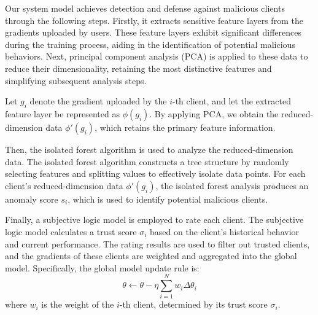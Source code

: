 \documentclass[conference]{IEEEtran}
\begin{document}




Our system model achieves detection and defense against malicious clients through the following steps. Firstly, it extracts sensitive feature layers from the gradients uploaded by users. These feature layers exhibit significant differences during the training process, aiding in the identification of potential malicious behaviors. Next, principal component analysis (PCA) is applied to these data to reduce their dimensionality, retaining the most distinctive features and simplifying subsequent analysis steps.

Let \( g_i \) denote the gradient uploaded by the \( i \)-th client, and let the extracted feature layer be represented as \( \phi(g_i) \). By applying PCA, we obtain the reduced-dimension data \( \phi'(g_i) \), which retains the primary feature information.

Then, the isolated forest algorithm is used to analyze the reduced-dimension data. The isolated forest algorithm constructs a tree structure by randomly selecting features and splitting values to effectively isolate data points. For each client's reduced-dimension data \( \phi'(g_i) \), the isolated forest analysis produces an anomaly score \( s_i \), which is used to identify potential malicious clients.

Finally, a subjective logic model is employed to rate each client. The subjective logic model calculates a trust score \( \sigma_i \) based on the client's historical behavior and current performance. The rating results are used to filter out trusted clients, and the gradients of these clients are weighted and aggregated into the global model. Specifically, the global model update rule is:
\[
\theta \leftarrow \theta - \eta \sum_{i=1}^N w_i \Delta \theta_i
\]
where \( w_i \) is the weight of the \( i \)-th client, determined by its trust score \( \sigma_i \).
\end{document}
